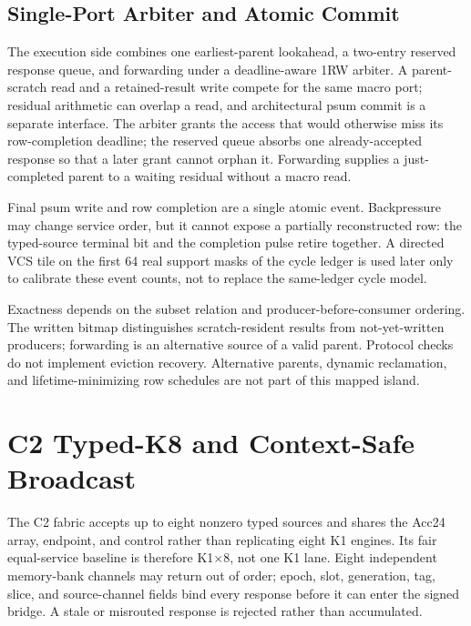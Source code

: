 \documentclass[journal]{IEEEtran}
\begin{document}
\subsection{Single-Port Arbiter and Atomic Commit}
The execution side combines one earliest-parent lookahead, a two-entry
reserved response queue, and forwarding under a deadline-aware 1RW arbiter.
A parent-scratch read and a retained-result write compete for the same
macro port; residual arithmetic can overlap a read, and architectural psum
commit is a separate interface.  The arbiter grants the access that would otherwise miss its
row-completion deadline; the reserved queue absorbs one already-accepted
response so that a later grant cannot orphan it.  Forwarding supplies a
just-completed parent to a waiting residual without a macro read.

Final psum write and row completion are a single atomic event.  Backpressure
may change service order, but it cannot expose a partially reconstructed row:
the typed-source terminal bit and the completion pulse retire together.  A
directed VCS tile on the first 64 real support masks of the cycle ledger is
used later only to calibrate these event counts, not to replace the
same-ledger cycle model.

Exactness depends on the subset relation and producer-before-consumer
ordering.  The written bitmap distinguishes scratch-resident results from
not-yet-written producers; forwarding is an alternative source of a valid
parent.  Protocol checks do not implement eviction recovery.  Alternative
parents, dynamic reclamation, and lifetime-minimizing row schedules are not
part of this mapped island.

\section{C2 Typed-K8 and Context-Safe Broadcast}
The C2 fabric accepts up to eight nonzero typed sources and shares the Acc24
array, endpoint, and control rather than replicating eight K1 engines.  Its
fair equal-service baseline is therefore K1$\times$8, not one K1 lane.  Eight
independent memory-bank channels may return out of order; epoch, slot,
generation, tag, slice, and source-channel fields bind every response before it
can enter the signed bridge.  A stale or misrouted response is rejected rather
than accumulated.
\end{document}
